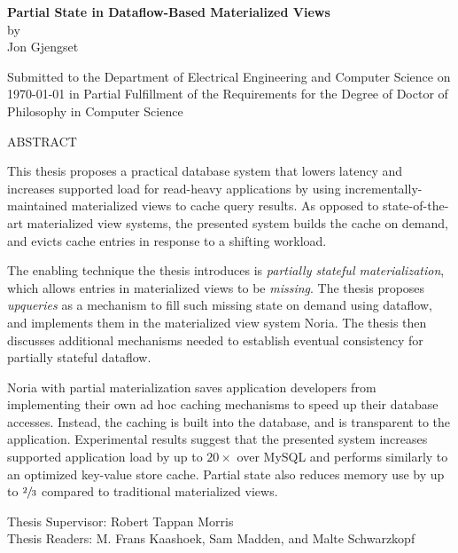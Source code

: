 \documentclass[fontsize=12pt,paper=letter]{scrartcl}
\begin{document}
\begin{titlepage}
  \begin{center}
    \textbf{\large Partial State in Dataflow-Based Materialized Views}\\
    \vspace{0.5\baselineskip}
    by\\
    \vspace{0.5\baselineskip}
    {\large Jon Gjengset}\\
    \vspace{0.5\baselineskip}
    \begin{addmargin}[0.15in]{0.15in}
      \centering
    Submitted to the Department of
    Electrical Engineering and Computer Science
    on \today{}
    in Partial Fulfillment of the Requirements for the Degree of
    Doctor of Philosophy in Computer Science
    \end{addmargin}
  \end{center}

  \begin{flushleft}
  ABSTRACT
  \vspace{0.5\baselineskip}

  This thesis proposes a practical database system that lowers latency and
    increases supported load for read-heavy applications by using
    incrementally-maintained materialized views to cache query results. As
    opposed to state-of-the-art materialized view systems, the presented system
    builds the cache on demand, and evicts cache entries in response to a
    shifting workload.

  \vspace{0.5\baselineskip}

  The enabling technique the thesis introduces is \textit{partially stateful
    materialization}, which allows entries in materialized views to be
    \textit{missing}. The thesis proposes \textit{upqueries} as a mechanism to
    fill such missing state on demand using dataflow, and implements them in the
    materialized view system Noria. The thesis then discusses additional
    mechanisms needed to establish eventual consistency for partially stateful
    dataflow.

  \vspace{0.5\baselineskip}

  Noria with partial materialization saves application developers from
    implementing their own ad hoc caching mechanisms to speed up their database
    accesses. Instead, the caching is built into the database, and is
    transparent to the application. Experimental results suggest that the
    presented system increases supported application load by up to $20\times$
    over MySQL and performs similarly to an optimized key-value store cache.
    Partial state also reduces memory use by up to $\sfrac{2}{3}$ compared to
    traditional materialized views.

  \vspace{\baselineskip}
  Thesis Supervisor: Robert Tappan Morris\\
  Thesis Readers: M. Frans Kaashoek, Sam Madden, and Malte Schwarzkopf
  \end{flushleft}
\end{titlepage}
\end{document}
